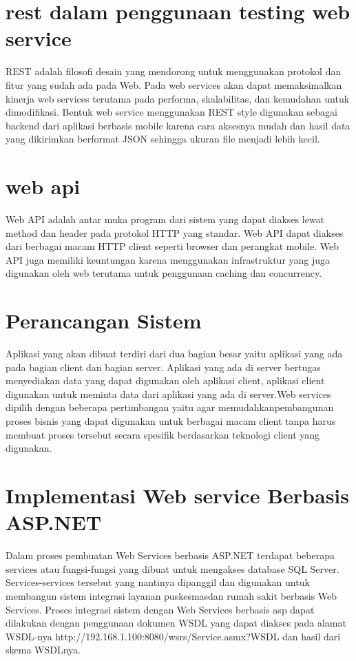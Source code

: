 \documentclass[12pt,a4paper]{article}
\begin{document}
\section{rest dalam penggunaan testing web service}
REST adalah filosofi desain yang mendorong untuk menggunakan protokol dan fitur yang sudah ada pada Web. Pada web services akan dapat memaksimalkan kinerja web services terutama pada performa, skalabilitas, dan kemudahan untuk dimodifikasi. Bentuk web service menggunakan REST style digunakan sebagai backend dari aplikasi berbasis mobile karena cara aksesnya  mudah dan hasil data yang dikirimkan berformat JSON sehingga ukuran file menjadi lebih kecil. 


\section{web api}
Web API adalah antar muka program dari sistem yang dapat diakses lewat method dan
header pada protokol HTTP yang standar. Web API dapat diakses dari berbagai macam HTTP
client seperti browser dan perangkat mobile. Web API juga memiliki keuntungan karena
menggunakan infrastruktur yang juga digunakan oleh web terutama untuk penggunaan caching
dan concurrency.


\section{Perancangan Sistem}
Aplikasi yang akan dibuat terdiri dari dua bagian besar yaitu aplikasi yang ada pada bagian client dan bagian server. 
Aplikasi yang ada di server bertugas menyediakan data yang dapat digunakan oleh aplikasi client, aplikasi client digunakan
untuk meminta data dari aplikasi yang ada di server.Web services dipilih dengan beberapa pertimbangan yaitu agar 
memudahkanpembangunan proses bisnis yang dapat digunakan untuk berbagai macam client tanpa harus membuat proses 
tersebut secara spesifik berdasarkan teknologi client yang digunakan.


\section{Implementasi Web service Berbasis ASP.NET}
Dalam proses pembuatan Web Services berbasis ASP.NET terdapat beberapa services atau fungsi-fungsi
yang dibuat untuk mengakses database SQL Server. Services-services tersebut yang nantinya dipanggil 
dan digunakan untuk membangun sistem integrasi layanan puskesmasdan rumah sakit berbasis Web Services.
Proses integrasi sistem dengan Web Services berbasis asp dapat dilakukan dengan penggunaan dokumen WSDL
yang dapat diakses pada alamat WSDL-nya http://192.168.1.100:8080/wsrs/Service.asmx?WSDL dan hasil dari skema WSDLnya.
\end{document}
